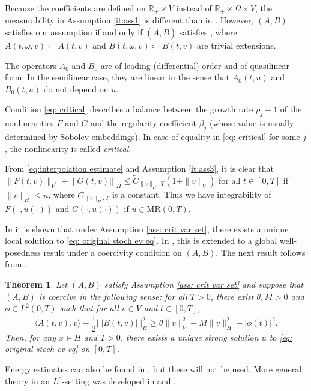 \documentclass{amsart}
\renewcommand{\MR}{\mathrm{MR}}
\newcommand{\<}{\langle}
\newcommand{\?}{\rangle}
\newcommand{\nn}{|\!|\!|}
\theoremstyle{plain}
\newtheorem{theorem}{Theorem}[section]
\theoremstyle{remark}
\theoremstyle{plain}
\numberwithin{equation}{section}
\def\R{{\mathbb R}}
\newcommand{\om}{\omega}
\newcommand{\Om}{\Omega}
\begin{document}
Because the coefficients are defined on $\R_+\times V$ instead of $\R_+\times\Om\times V$, the measurability in Assumption \ref{it:ass1} is different than in \cite[Assumption 3.1]{AV22variational}. However, $(A,B)$ satisfies our assumption if and only if $(\bar{A},\bar{B})$ satisfies \cite[Assumption 3.1]{AV22variational}, where  $\bar{A}(t,\om,v)\coloneqq A(t,v)$ and $\bar{B}(t,\om,v)\coloneqq B(t,v)$ are trivial extensions.

The operators $A_0$ and $B_0$ are of leading (differential) order and of quasilinear form. In the semilinear case, they are linear in the sense that   $A_0(t,u)$ and $B_0(t,u)$ do not depend on $u$.

Condition \eqref{eq: critical} describes a balance between the growth rate $\rho_j+1$ of the nonlinearities $F$ and $G$
and the regularity coefficient $\beta_j$ (whose value is usually determined by Sobolev embeddings). In case of equality in \eqref{eq: critical} for some $j$, the nonlinearity is called \emph{critical}.

From \eqref{eq:interpolation estimate} and Assumption \ref{it:ass3}, it is clear that  $\|F(t,v)\|_{V^*}+\nn G(t,v)\nn_H\leq \tilde{C}_{\|v\|_H,T}(1+\|v\|_V)$ for all $t\in[0,T]$ if $\|v\|_H\leq n$, where $\tilde{C}_{\|v\|_H,T}$ is a constant. Thus we have integrability of $F(\cdot,u(\cdot))$ and $G(\cdot,u(\cdot))$ if $u\in\MR(0,T)$.

In \cite[Th. 3.3]{AV22variational} it is shown that under Assumption \ref{ass: crit var set}, there exists a unique local solution to \eqref{eq: original stoch ev eq}. In \cite[Th. 3.5]{AV22variational}, this is extended to a global well-posedness result under a  coercivity condition on $(A,B)$.
The next result follows from \cite[Th. 3.5]{AV22variational}.
\begin{theorem}\label{th: original stoch ev eq global well-posedness}
Let $(A,B)$ satisfy Assumption \ref{ass: crit var set} and suppose that $(A,B)$ is coercive in the following sense: for all $T>0$, there exist $\theta, M>0$ and $\phi\in L^2(0,T)$ such that for all $v\in V$ and $t\in[0,T]$,
\begin{equation}\label{eq: coercivity condition (A,B)}
\<A(t,v),v\?-\frac{1}{2}\nn B(t,v)\nn_H^2 \geq \theta\|v\|_V^2-M\|v\|_H^2-|\phi(t)|^2.
\end{equation}
Then, for any $x\in H$ and $T>0$, there exists a unique strong solution $u$ to \eqref{eq: original stoch ev eq} on $[0,T]$.
\end{theorem}
Energy estimates can also be found in \cite[Th. 3.5]{AV22variational}, but these will not be used. More general theory in an $L^p$-setting was developed in \cite{AV22nonlinear1} and \cite{AV22nonlinear2}.
\end{document}
